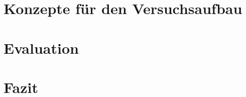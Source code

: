 \chapter{Konzepte f\"{u}r den Versuchsaufbau}\label{ch:concepts}








\chapter{Evaluation}\label{ch:evaluation}




\chapter{Fazit}\label{ch:conclusion}



